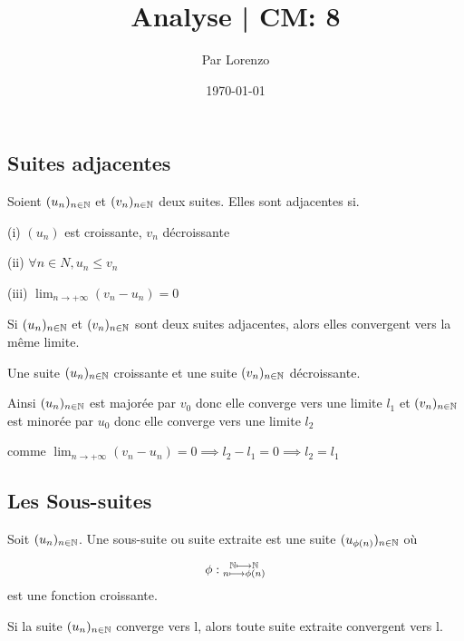\documentclass[a4paper, 12pt]{article}
\title{Analyse | CM: 8}
\author{Par Lorenzo}
\date{\today}
\begin{document}
\maketitle

\subsection{Suites adjacentes}

\begin{definition}
    Soient $(u_n)_{n \in \mathbb{N}}$ et $(v_n)_{n \in \mathbb{N}}$ deux suites. Elles sont adjacentes si.

    \item (i) $(u_n)$ est croissante, $v_n$ décroissante
    \item (ii) $\forall n \in N, u_n \leq v_n$
    \item (iii) $\lim_{n \to +\infty} (v_n - u_n) = 0$
\end{definition}

\begin{theorem}
    Si $(u_n)_{n \in \mathbb{N}}$ et $(v_n)_{n \in \mathbb{N}}$ sont deux suites adjacentes, alors elles convergent vers la même limite.
\end{theorem}

\begin{demonstration}
    Une suite $(u_n)_{n \in \mathbb{N}}$ croissante et une suite $(v_n)_{n \in \mathbb{N}}$ décroissante.

    Ainsi $(u_n)_{n \in \mathbb{N}}$ est majorée par $v_0$ donc elle converge vers une limite $l_1$
    et $(v_n)_{n \in \mathbb{N}}$ est minorée par $u_0$ donc elle converge vers une limite $l_2$

    comme $\lim_{n \to +\infty}(v_n - u_n) = 0 \implies l_2 - l_1 = 0 \implies l_2 = l_1$
\end{demonstration}

\subsection{Les Sous-suites}

\begin{definition}
    Soit $(u_n)_{n \in \mathbb{N}}$. Une sous-suite ou suite extraite est une suite
    $(u_{\phi(n)})_{n \in \mathbb{N}}$ où

    $$
    \phi: \substack{\mathbb{N} \longmapsto \mathbb{N} \\ n \longmapsto \phi(n)}
    $$
    est une fonction croissante.
\end{definition}

\begin{proposition}
    Si la suite $(u_n)_{n \in \mathbb{N}}$ converge vers l, alors toute suite extraite convergent vers l.
\end{proposition}
\end{document}
